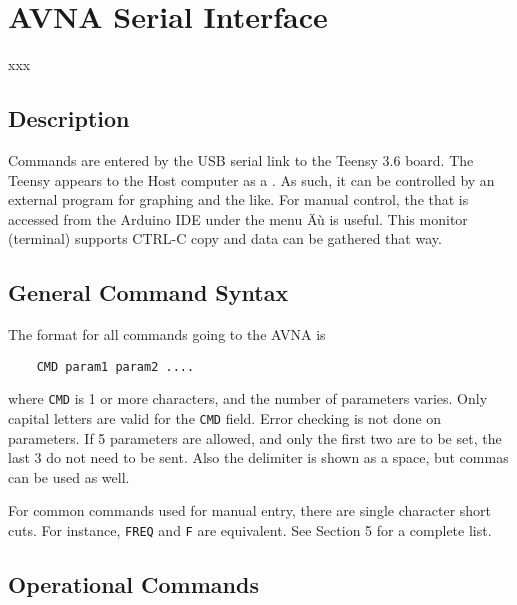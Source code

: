 \section{AVNA Serial Interface}
xxx
\subsection{Description}
Commands are entered by the USB serial link to the Teensy 3.6 board. The Teensy appears to the Host computer as a . As such, it can be controlled by an external program for graphing and the like.  For manual control, the  that is accessed from the Arduino IDE under the menu Äù is useful.  This monitor (terminal) supports CTRL-C copy and data can be gathered that way.

\subsection{General Command Syntax}
The format for all commands going to the AVNA is
\begin{verbatim}
    CMD param1 param2 ....
\end{verbatim}
where \texttt{CMD} is 1 or more characters, and the number of parameters varies.  Only capital letters are valid for the \texttt{CMD} field. Error checking is not done on parameters.  If 5 parameters are allowed, and only the first two are to be set, the last 3 do not need to be sent.  Also the delimiter is shown as a space, but commas can be used as well.

For common commands used for manual entry, there are single character short cuts.  For instance, \texttt{FREQ} and \texttt{F} are equivalent. See Section 5 for a complete list.

\subsection{Operational Commands}

